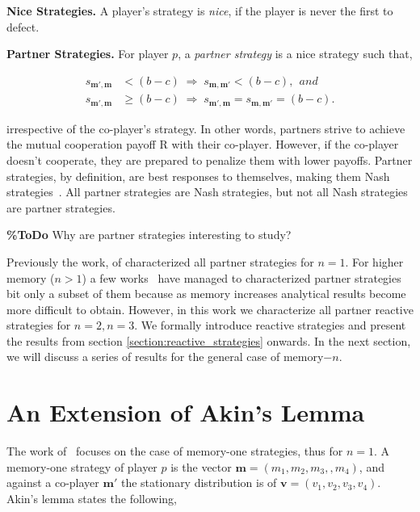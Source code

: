 \documentclass{article}
\theoremstyle{definition}
\begin{document}
{\bf Nice Strategies.} A player's strategy is \textit{nice}, if the player is
never the first to defect.

{\bf Partner Strategies.} For player $p$, a \textit{partner strategy} is a nice
strategy such that,

\begin{align}\label{Eq:Partner}
    s_{\mathbf{m'},\mathbf{m}} & < (b - c) \; \Rightarrow \; s_{\mathbf{m},\mathbf{m'}} < (b - c), ~~and~~\\
    s_{\mathbf{m'},\mathbf{m}} & \geq (b - c) \; \Rightarrow \; s_{\mathbf{m'},\mathbf{m}} = s_{\mathbf{m},\mathbf{m'}} = (b - c).
\end{align}

irrespective of the co-player's strategy. In other words, partners strive to
achieve the mutual cooperation payoff R with their co-player. However, if the
co-player doesn't cooperate, they are prepared to penalize them with lower
payoffs. Partner strategies, by definition, are best responses to themselves,
making them Nash strategies~\cite{Hilbe:GEB:2015}. All partner strategies are
Nash strategies, but not all Nash strategies are partner strategies.

{\bf \%ToDo} Why are partner strategies interesting to study?

Previously the work, of \citep{akin:EGADS:2016} characterized all partner
strategies for $n=1$. For higher memory ($n>1$) a few
works~\citep{hilbe:PNAS:2017} have managed to characterized partner strategies
bit only a subset of them because as memory increases analytical results become
more difficult to obtain. However, in this work we characterize all partner
reactive strategies for $n=2, n=3$. We formally introduce reactive strategies
and present the results from section \ref{section:reactive_strategies} onwards.
In the next section, we will discuss a series of results for the general case of
memory$-n$.

\section{An Extension of Akin's Lemma}

The work of~\citep{akin:EGADS:2016} focuses on the case of memory-one
strategies, thus for $n=1$. A memory-one strategy of player $p$ is the vector
$\mathbf{m} = (m_1, m_2, m_3, ,m_4)$, and against a co-player $\mathbf{m}'$ the
stationary distribution is of $\mathbf{v} = (v_1, v_2, v_3, v_4)$. Akin's lemma
states the following,
\end{document}
